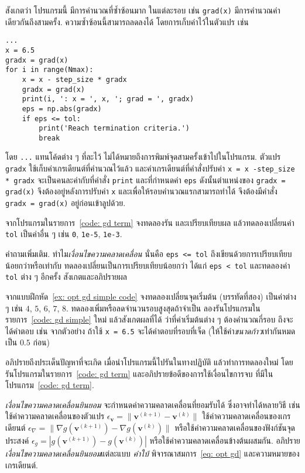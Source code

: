 \begin{Exercise}
	สังเกตว่า
	โปรแกรมนี้
	มีการคำนวณที่ซ้ำซ้อนมาก ในแต่ละรอบ  เช่น \texttt{grad(x)} มีการคำนวณค่าเดียวกันถึงสามครั้ง.
	ความซ้ำซ้อนนี้สามารถลดลงได้ โดยการเก็บค่าไว้ในตัวแปร เช่น
	\begin{Verbatim}[fontsize=\small]
...
x = 6.5
gradx = grad(x)
for i in range(Nmax):
    x = x - step_size * gradx
    gradx = grad(x)
    print(i, ': x = ', x, '; grad = ', gradx)
    eps = np.abs(gradx)
    if eps <= tol:
        print('Reach termination criteria.')
        break
	\end{Verbatim}
	โดย \texttt{...} แทนโค้ดต่าง ๆ ที่ละไว้ ไม่ได้หมายถึงการพิมพ์จุดสามครั้งเข้าไปในโปรแกรม.
	ตัวแปร \texttt{gradx} ใช้เก็บค่าเกรเดียนต์ที่คำนวณไว้แล้ว
	และค่าเกรเดียนต์ที่คำสั่งปรับค่า \verb|x = x -step_size * gradx| จะเป็นคนละค่ากับที่คำสั่ง \texttt{print} และที่กำหนดค่า \texttt{eps}
	ดังนั้นตำแหน่งของ \texttt{gradx = grad(x)} จึงต้องอยู่หลังการปรับค่า \texttt{x}
	และเพื่อให้รอบคำนวณแรกสามารถทำได้ จึงต้องมีคำสั่ง
	\texttt{gradx = grad(x)} อยู่ก่อนเข้าลูปด้วย.
	
	จากโปรแกรมในรายการ~\ref{code: gd term}
	จงทดลองรัน และเปรียบเทียบผล
	แล้วทดลองเปลี่ยนค่า \texttt{tol} เป็นค่าอื่น ๆ เช่น \texttt{0}, \verb|1e-5|, \verb|1e-3|.
	
	คำถามเพิ่มเติม. 
	ทำไม\textit{เงื่อนไขความคลาดเคลื่อน}
	นั่นคือ \texttt{eps <= tol}
	ถึงเขียนด้วยการเปรียบเทียบน้อยกว่าหรือเท่ากับ 
	ทดลองเปลี่ยนเป็นการเปรียบเทียบน้อยกว่า ได้แก่ \texttt{eps < tol} และทดลองค่า \texttt{tol} ต่าง ๆ อีกครั้ง 
	สังเกตและอภิปรายผล
	
\end{Exercise}

\begin{Exercise}
	\label{ex: opt gd motivation to term}
	จากแบบฝึกหัด~\ref{ex: opt gd simple code}
	จงทดลองเปลี่ยนจุดเริ่มต้น (บรรทัดที่สอง) เป็นค่าต่าง ๆ เช่น $4$, $5$, $6$, $7$, $8$. ทดลองเพิ่มหรือลดจำนวนรอบสูงสุดถ้าจำเป็น 
	ลองรันโปรแกรมในรายการ~\ref{code: gd simple} ใหม่
	แล้วสังเกตผลที่ได้ ว่าที่ค่าเริ่มต้นต่าง ๆ ต้องคำนวณกี่รอบ ถึงจะได้คำตอบ เช่น จากตัวอย่าง ถ้าใช้ \texttt{x = 6.5} จะได้คำตอบที่รอบที่เจ็ด
	(ให้ใช้ค่า\textit{ขนาดก้าว}เท่ากันหมดเป็น $0.5$ ก่อน)
	
	อภิปรายถึงประเด็นปัญหาที่จะเกิด เมื่อนำโปรแกรมนี้ไปรันในทางปฏิบัติ
	แล้วทำการทดลองใหม่ โดยรันโปรแกรมในรายการ~\ref{code: gd term} และอภิปรายข้อดีของการใช้เงื่อนไขการจบ ที่มีในโปรแกรม~\ref{code: gd term}.
	
\end{Exercise}

\begin{Exercise}
	\textit{เงื่อนไขความคลาดเคลื่อนยินยอม}
	จะกำหนดค่าความคลาดเคลื่อนที่ยอมรับได้ ซึ่งอาจทำได้หลายวิธี เช่น
	ใช้ค่าความคลาดเคลื่อนของตัวแปร $\epsilon_{\bm{v}} = \|\bm{v}^{(k+1)} - \bm{v}^{(k)}\|$
	ใช้ค่าความคลาดเคลื่อนของเกรเดียนต์
	$\epsilon_{\nabla} = \|\nabla g(\bm{v}^{(k+1)}) - \nabla g(\bm{v}^{(k)})\|$
	หรือใช้ค่าความคลาดเคลื่อนของฟังก์ชันจุดประสงค์
	$\epsilon_g = | g(\bm{v}^{(k+1)}) -  g(\bm{v}^{(k)})|$
	หรือใช้ค่าความคลาดเคลื่อนข้างต้นผสมกัน.
	อภิปราย\textit{เงื่อนไขความคลาดเคลื่อนยินยอม}แต่ละแบบ
	\textit{คำใบ้} พิจารณาสมการ~\ref{eq: opt gd} และความหมายของเกรเดียนต์.
	
\end{Exercise}


